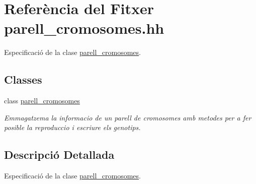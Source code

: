 \hypertarget{parell__cromosomes_8hh}{}\section{Referència del Fitxer parell\+\_\+cromosomes.\+hh}
\label{parell__cromosomes_8hh}


Especificació de la clase \hyperlink{classparell__cromosomes}{parell\+\_\+cromosomes}.  


\subsection*{Classes}
\begin{DoxyCompactItemize}
\item 
class \hyperlink{classparell__cromosomes}{parell\+\_\+cromosomes}
\begin{DoxyCompactList}\small\item\em Emmagatzema la informacio de un parell de cromosomes amb metodes per a fer posible la reproduccio i escriure els genotips. \end{DoxyCompactList}\end{DoxyCompactItemize}


\subsection{Descripció Detallada}
Especificació de la clase \hyperlink{classparell__cromosomes}{parell\+\_\+cromosomes}. 

